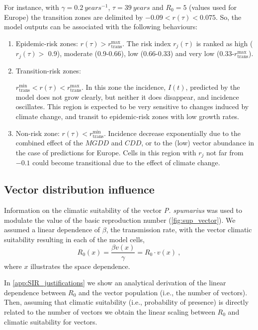 For instance, with $\gamma=\SI{0.2}{years^{-1}}$, $\tau=\SI{39}{years}$ and
$R_0=5$ (values used for Europe) the transition zones are delimited by
$-0.09<r(\tau)<0.075$. So, the model outputs can be associated with the
following behaviours:
\begin{enumerate}
    \item Epidemic-risk zones: $r(\tau)>r_{\textrm{trans}}^{\textrm{max}}$.
          The risk index $r_j(\tau)$ is ranked as high ($r_j(\tau) >$ 0.9),
          moderate
          (0.9-0.66), low (0.66-0.33) and very low
          (0.33-$r_{\textrm{trans}}^{\textrm{max}}$).
    \item Transition-risk zones:

          $r_{\textrm{trans}}^{\textrm{min}}<r(\tau)<r_{\textrm{trans}}^{\textrm{max}}$.
          In this zone the incidence, $I(t)$, predicted by the model does not
          grow
          clearly, but neither it does disappear, and incidence oscillates.
          This region
          is expected to be very sensitive to changes induced by climate
          change, and
          transit to epidemic-risk zones with low growth rates.
    \item Non-risk zone: $r(\tau)<r_{\textrm{trans}}^{\textrm{min}}$.
          Incidence decrease exponentially due to the combined effect of the
          $MGDD$ and
          $CDD$, or to the (low) vector abundance in the case of predictions
          for Europe.
          Cells in this region with $r_j$ not far from $-0.1$ could become
          transitional
          due to the effect of climate change.
\end{enumerate}

\subsection{Vector distribution influence}\label{app:vector_influence}

Information on the climatic suitability of the vector \textit{P. spumarius}
\cite{Godefroid2021} was used to modulate the value of the basic reproduction
number (\cref{fig:sup_vector}). We assumed a linear dependence of $\beta$, the
transmission rate, with
the vector climatic suitability resulting in each of the model cells,
\begin{equation}
    R_0(x)=\frac{\beta v(x)}{\gamma}=R_0\cdot v(x) \ ,
\end{equation}
where $x$ illustrates the space dependence.

In \cref{app:SIR_justifications} we show an analytical derivation of the
linear dependence between $R_0$ and the vector population (i.e., the number of
vectors). Then, assuming that climatic suitability (i.e., probability of
presence) is directly related to the number of vectors we obtain the linear
scaling between $R_0$ and climatic suitability for vectors.

